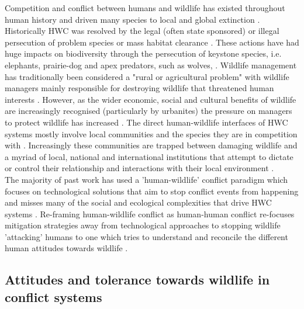 Competition and conflict between humans and wildlife has existed throughout human history and driven many species to local and global extinction \citep{Graham2005,Woodroffe2005a}. Historically HWC was resolved by the legal (often state sponsored) or illegal persecution of problem species or mass habitat clearance \citep{Woodroffe2005a,treves2005evaluating}. These actions have had huge impacts on biodiversity through the persecution of keystone species, i.e. elephants, prairie-dog and apex predators, such as wolves, \citep{Woodroffe2005a,Kotliar1999,sinclair1995equilibria,Ripple2001}. Wildlife management has traditionally been considered a "rural or agricultural problem" \citep{Messmer2000} with wildlife managers mainly responsible for destroying wildlife that threatened human interests \citep{treves2005evaluating}. However, as the wider economic, social and cultural benefits of wildlife are increasingly recognised (particularly by urbanites) the pressure on managers to protect wildlife has increased \citep{treves2005evaluating}. The direct human-wildlife interfaces of HWC systems mostly involve local communities and the species they are in competition with \citep{Thirgood2005}. Increasingly these communities are trapped between damaging wildlife and a myriad of local, national and international institutions that attempt to dictate or control their relationship and interactions with their local environment \citep{naughton2005socio}.\\

The majority of past work has used a 'human-wildlife' conflict paradigm \citep{Dickman2010b,Peterson2010b,Redpath2014b} which focuses on technological solutions that aim to stop conflict events from happening \citep{naughton2005socio} and misses many of the social and ecological complexities that drive HWC systems \citep{Redpath2014b}. Re-framing human-wildlife conflict as human-human conflict re-focuses mitigation strategies away from technological approaches to stopping wildlife 'attacking' humans to one which tries to understand and reconcile the different human attitudes towards wildlife \citep{Redpath2014b}.\\

\subsection{Attitudes and tolerance towards wildlife in conflict systems}

